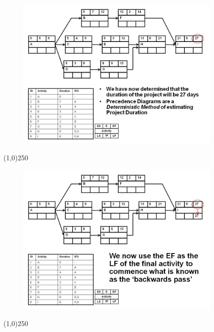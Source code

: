 \begin{frame}
\begin{figure}
	\centering
		\includegraphics[width = 10.0cm]{oldnotes/Slide150.jpg}
\end{figure}
\end{frame}
\begin{center}\line(1,0){250}\end{center}




\begin{frame}
\begin{figure}
	\centering
		\includegraphics[width = 10.0cm]{oldnotes/Slide151.jpg}
\end{figure}
\end{frame}
\begin{center}\line(1,0){250}\end{center}




